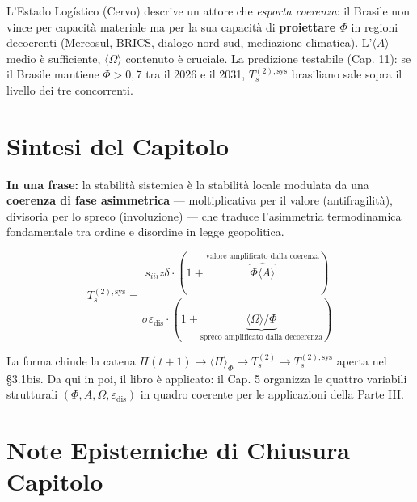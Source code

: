 L'Estado Logístico (Cervo) descrive un attore che \emph{esporta
coerenza}: il Brasile non vince per capacità materiale ma per la sua
capacità di \textbf{proiettare \(\Phi\)} in regioni decoerenti
(Mercosul, BRICS, dialogo nord-sud, mediazione climatica).
L'\(\langle A\rangle\) medio è sufficiente, \(\langle\Omega\rangle\)
contenuto è cruciale. La predizione testabile (Cap. 11): se il Brasile
mantiene \(\Phi > 0{,}7\) tra il 2026 e il 2031,
\(T_s^{(2),\text{sys}}\) brasiliano sale sopra il livello dei tre
concorrenti.



\section{Sintesi del Capitolo}\label{sintesi-del-capitolo}

\Proved{} \textbf{In una frase:} la stabilità sistemica è la stabilità
locale modulata da una \textbf{coerenza di fase asimmetrica} ---
moltiplicativa per il valore (antifragilità), divisoria per lo spreco
(involuzione) --- che traduce l'asimmetria termodinamica fondamentale
tra ordine e disordine in legge geopolitica.

\[
T_s^{(2),\text{sys}} = \frac{s_{iii} z \delta \cdot (1 + \overbrace{\Phi\langle A\rangle}^{\text{valore amplificato dalla coerenza}})}{\sigma \varepsilon_{\text{dis}} \cdot (1 + \underbrace{\langle\Omega\rangle/\Phi}_{\text{spreco amplificato dalla decoerenza}})}
\]

La forma chiude la catena
\(\Pi(t+1) \to \langle\Pi\rangle_\Phi \to T_s^{(2)} \to T_s^{(2),\text{sys}}\)
aperta nel \S{}3.1bis. Da qui in poi, il libro è applicato: il Cap. 5
organizza le quattro variabili strutturali
\((\Phi, A, \Omega, \varepsilon_{\text{dis}})\) in quadro coerente per
le applicazioni della Parte III.



\section{Note Epistemiche di Chiusura
Capitolo}\label{note-epistemiche-di-chiusura-capitolo}

